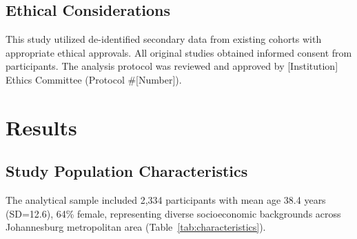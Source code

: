 \documentclass[11pt,a4paper]{article}
\begin{document}
\subsection{Ethical Considerations}

This study utilized de-identified secondary data from existing cohorts with appropriate ethical approvals. All original studies obtained informed consent from participants. The analysis protocol was reviewed and approved by [Institution] Ethics Committee (Protocol \#[Number]).

\section{Results}

\subsection{Study Population Characteristics}

The analytical sample included 2,334 participants with mean age 38.4 years (SD=12.6), 64\% female, representing diverse socioeconomic backgrounds across Johannesburg metropolitan area (Table~\ref{tab:characteristics}).
\end{document}
